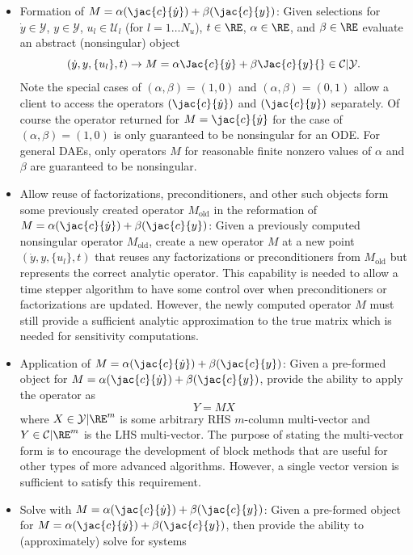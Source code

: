 \documentclass[pdf,ps2pdf,11pt]{SANDreport}
\begin{document}
\begin{itemize}
\begin{itemize}
%
{}\item Formation of $M = {}\alpha (\jac{c}{\dot{y}}) + {}\beta (\jac{c}{y})$:
Given selections for $\dot{y}\in\mathcal{Y}$, $y\in\mathcal{Y}$,
$u_l\in\mathcal{U}_l$ (for $l=1\ldots{}N_u$), $t\in\RE$, $\alpha\in\RE$, and
$\beta\in\RE$ evaluate an abstract (nonsingular) object
\[
(\dot{y},y,\{u_l\},t) {}\rightarrow M
= {}\alpha \Jac{c}{{}\dot{y}} + \beta \Jac{c}{y}
{}\in {}\mathcal{C}|\mathcal{Y}.
\]
Note the special cases of $(\alpha,\beta)=(1,0)$ and $(\alpha,\beta)=(0,1)$
allow a client to access the operators $(\jac{c}{\dot{y}})$ and $(\jac{c}{y})$
separately.  Of course the operator returned for $M = \jac{c}{\dot{y}}$ for
the case of $(\alpha,\beta)=(1,0)$ is only guaranteed to be nonsingular for an
ODE.  For general DAEs, only operators $M$ for reasonable finite nonzero
values of $\alpha$ and $\beta$ are guaranteed to be nonsingular.
%
{}\item Allow reuse of factorizations, preconditioners, and other such objects
form some previously created operator $M_{\mbox{old}}$ in the reformation of
$M = {}\alpha (\jac{c}{\dot{y}}) + {}\beta (\jac{c}{y})$: Given a previously
computed nonsingular operator $M_{\mbox{old}}$, create a new operator $M$ at a
new point $(\dot{y},y,\{u_l\},t)$ that reuses any factorizations or
preconditioners from $M_{\mbox{old}}$ but represents the correct analytic
operator.  This capability is needed to allow a time stepper algorithm to have
some control over when preconditioners or factorizations are updated.
However, the newly computed operator $M$ must still provide a sufficient
analytic approximation to the true matrix which is needed for sensitivity
computations.
%
{}\item Application of $M = {}\alpha (\jac{c}{\dot{y}}) + {}\beta
(\jac{c}{y})$: Given a pre-formed object for $M = {}\alpha (\jac{c}{\dot{y}})
+ {}\beta (\jac{c}{y})$, provide the ability to apply the operator as
\[
Y = M X
\]
where $X\in\mathcal{Y}|\RE^m$ is some arbitrary RHS $m$-column multi-vector
and $Y\in\mathcal{C}|\RE^m$ is the LHS multi-vector.  The purpose of stating
the multi-vector form is to encourage the development of block methods that
are useful for other types of more advanced algorithms.  However, a single
vector version is sufficient to satisfy this requirement.
%
{}\item Solve with $M = {}\alpha (\jac{c}{\dot{y}}) + {}\beta (\jac{c}{y})$:
Given a pre-formed object for $M = {}\alpha (\jac{c}{\dot{y}}) + {}\beta
(\jac{c}{y})$, then provide the ability to (approximately) solve for systems

\end{itemize}
\end{itemize}
\end{document}
